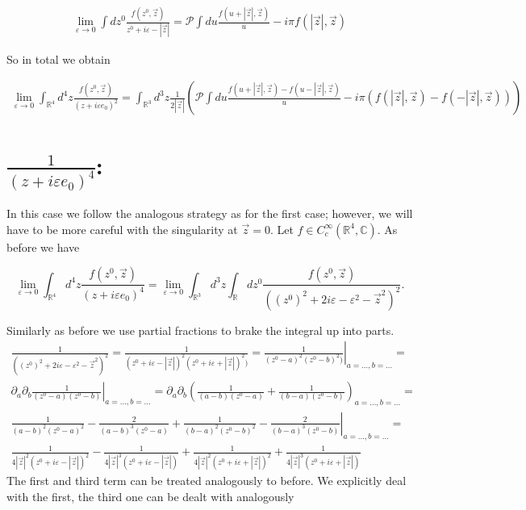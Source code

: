 \documentclass[a4paper,11pt]{article}
\begin{document}
\begin{align}
\lim_{\varepsilon \rightarrow 0 }\int d z^0 \frac{f(z^0,\vec{z})}{z^0+i \varepsilon -|\vec{z}|}=
\mathcal{P} \int d u \frac{f(u + |\vec{z}|,\vec{z})}{u} - i \pi f(|\vec{z}|,\vec{z})
\end{align}

So in total we obtain 

\begin{align}
\lim_{\varepsilon \rightarrow 0} \int_{\mathbb{R}^4} d^4z \frac{f(z^0,\vec{z})}{(z+i \varepsilon e_0)^2}
=\int_{\mathbb{R}^3} d^3 z \frac{1}{2 |\vec{z}|} \left( \mathcal{P}\int du \frac{f(u +|\vec{z}|,\vec{z}) - f(u-|\vec{z}|,\vec{z})}{u} 
- i \pi (f(|\vec{z}|,\vec{z})-f(-|\vec{z}|,\vec{z}))  \right)
\end{align}


\section{\(\frac{1}{(z+i\varepsilon e_0)^4}\):}

In this case we follow the analogous strategy as for the first case; however, we will have to be more careful with the singularity at \(\vec{z}=0\).
Let \(f\in C_c^\infty (\mathbb{R}^4, \mathbb{C})\). As before we have

\begin{equation}
\lim_{\varepsilon \rightarrow 0} \int_{\mathbb{R}^4}d^4z \frac{f(z^0,\vec{z})}{(z+i \varepsilon e_0)^4} 
= \lim_{\varepsilon \rightarrow 0} \int_{\mathbb{R}^3} d^3z \int_{\mathbb{R}} d z^0 \frac{f(z^0,\vec{z})}{((z^0)^2 + 2 i \varepsilon -\varepsilon^2 - \vec{z}^2)^2}. 
\end{equation}

Similarly as before we use partial fractions to brake the integral up into parts.
\begin{align}
\frac{1}{((z^0)^2 + 2 i \varepsilon -\varepsilon^2 - \vec{z}^2)^2}=
\frac{1}{(z^0+i\varepsilon - |\vec{z}|)^2(z^0+i\varepsilon + |\vec{z}|)^2)}=
\left.\frac{1}{(z^0-a)^2(z^0-b)^2)}\right|_{a=\dots, b=\dots}=\\
\left.\partial_a \partial_b \frac{1}{(z^0-a)(z^0-b)}\right|_{a=\dots, b=\dots}=
\partial_a \partial_b  \left(\frac{1}{(a-b)(z^0-a)} + \frac{1}{(b-a)(z^0-b)} \right)_{a=\dots, b=\dots}=\\
\left. \frac{1}{(a-b)^2(z^0-a)^2}-\frac{2}{(a-b)^3(z^0-a)} + \frac{1}{(b-a)^2(z^0-b)^2}-\frac{2}{(b-a)^3(z^0-b)}\right|_{a=\dots, b=\dots}=\\
\frac{1}{4|\vec{z}|^2(z^0 + i \varepsilon -|\vec{z}|)^2} -\frac{1}{4|\vec{z}|^3(z^0+i\varepsilon -|\vec{z}|)} + \frac{1}{4|\vec{z}|^2(z^0+i\varepsilon +|\vec{z}|)^2} + \frac{1}{4|\vec{z}|^3(z^0+i\varepsilon +|\vec{z}|)}
\end{align}
The first and third term can be treated analogously to before. We explicitly deal with the first, the third one can be dealt with analogously
\end{document}
